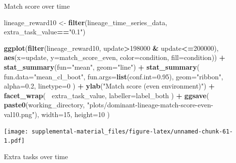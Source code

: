 \documentclass[]{book}
\newenvironment{Shaded}{\begin{snugshade}}{\end{snugshade}}
\newcommand{\DataTypeTok}[1]{\textcolor[rgb]{0.13,0.29,0.53}{#1}}
\newcommand{\DecValTok}[1]{\textcolor[rgb]{0.00,0.00,0.81}{#1}}
\newcommand{\FloatTok}[1]{\textcolor[rgb]{0.00,0.00,0.81}{#1}}
\newcommand{\KeywordTok}[1]{\textcolor[rgb]{0.13,0.29,0.53}{\textbf{#1}}}
\newcommand{\NormalTok}[1]{#1}
\newcommand{\OperatorTok}[1]{\textcolor[rgb]{0.81,0.36,0.00}{\textbf{#1}}}
\newcommand{\StringTok}[1]{\textcolor[rgb]{0.31,0.60,0.02}{#1}}
\begin{document}
Match score over time

\begin{Shaded}
\begin{Highlighting}[]
\NormalTok{lineage_reward10 <-}\StringTok{ }\KeywordTok{filter}\NormalTok{(lineage_time_series_data, extra_task_value}\OperatorTok{==}\StringTok{"0.1"}\NormalTok{)}

\KeywordTok{ggplot}\NormalTok{(}\KeywordTok{filter}\NormalTok{(lineage_reward10, update}\OperatorTok{>}\DecValTok{198000} \OperatorTok{&}\StringTok{ }\NormalTok{update}\OperatorTok{<=}\DecValTok{200000}\NormalTok{), }\KeywordTok{aes}\NormalTok{(}\DataTypeTok{x=}\NormalTok{update, }\DataTypeTok{y=}\NormalTok{match_score_even, }\DataTypeTok{color=}\NormalTok{condition, }\DataTypeTok{fill=}\NormalTok{condition)) }\OperatorTok{+}
\StringTok{  }\KeywordTok{stat_summary}\NormalTok{(}\DataTypeTok{fun=}\StringTok{"mean"}\NormalTok{, }\DataTypeTok{geom=}\StringTok{"line"}\NormalTok{) }\OperatorTok{+}
\StringTok{  }\KeywordTok{stat_summary}\NormalTok{(}
    \DataTypeTok{fun.data=}\StringTok{"mean_cl_boot"}\NormalTok{,}
    \DataTypeTok{fun.args=}\KeywordTok{list}\NormalTok{(}\DataTypeTok{conf.int=}\FloatTok{0.95}\NormalTok{),}
    \DataTypeTok{geom=}\StringTok{"ribbon"}\NormalTok{,}
    \DataTypeTok{alpha=}\FloatTok{0.2}\NormalTok{,}
    \DataTypeTok{linetype=}\DecValTok{0}
\NormalTok{  ) }\OperatorTok{+}
\StringTok{  }\KeywordTok{ylab}\NormalTok{(}\StringTok{"Match score (even environment)"}\NormalTok{) }\OperatorTok{+}
\StringTok{  }\KeywordTok{facet_wrap}\NormalTok{(}
    \OperatorTok{~}\NormalTok{extra_task_value,}
    \DataTypeTok{labeller=}\NormalTok{label_both}
\NormalTok{  ) }\OperatorTok{+}
\StringTok{  }\KeywordTok{ggsave}\NormalTok{(}
    \KeywordTok{paste0}\NormalTok{(working_directory, }\StringTok{"plots/dominant-lineage-match-score-even-val10.png"}\NormalTok{),}
    \DataTypeTok{width=}\DecValTok{15}\NormalTok{,}
    \DataTypeTok{height=}\DecValTok{10}
\NormalTok{  )}
\end{Highlighting}
\end{Shaded}

\texttt{[image: supplemental-material\_files/figure-latex/unnamed-chunk-61-1.pdf]}

Extra tasks over time
\end{document}
